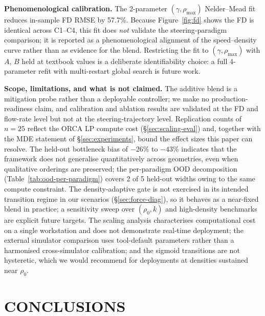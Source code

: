 \documentclass[a4paper,twoside]{article}
\begin{document}
\textbf{Phenomenological calibration.}
The 2-parameter $(\gamma,\rho_{\max})$ Nelder--Mead fit reduces in-sample FD RMSE by 57.7\%. Because Figure~\ref{fig:fd} shows the FD is identical across C1--C4, this fit does \emph{not} validate the steering-paradigm comparison; it is reported as a phenomenological alignment of the speed--density curve rather than as evidence for the blend. Restricting the fit to $(\gamma,\rho_{\max})$ with $A$, $B$ held at textbook values is a deliberate identifiability choice: a full 4-parameter refit with multi-restart global search is future work.

\textbf{Scope, limitations, and what is not claimed.}
The additive blend is a mitigation probe rather than a deployable controller; we make no production-readiness claim, and calibration and ablation results are validated at the FD and flow-rate level but not at the steering-trajectory level. Replication counts of $n=25$ reflect the ORCA LP compute cost (\S\ref{sec:scaling-eval}) and, together with the MDE statement of \S\ref{sec:experiments}, bound the effect sizes this paper can resolve. The held-out bottleneck bias of $-26\%$ to $-43\%$ indicates that the framework does not generalise quantitatively across geometries, even when qualitative orderings are preserved; the per-paradigm OOD decomposition (Table~\ref{tab:ood-per-paradigm}) covers 2 of 5 held-out widths owing to the same compute constraint. The density-adaptive gate is not exercised in its intended transition regime in our scenarios (\S\ref{sec:force-diag}), so it behaves as a near-fixed blend in practice; a sensitivity sweep over $(\rho_0,k)$ and high-density benchmarks are explicit future targets. The scaling analysis characterises computational cost on a single workstation and does not demonstrate real-time deployment; the external simulator comparison uses tool-default parameters rather than a harmonised cross-simulator calibration; and the sigmoid transitions are not hysteretic, which we would recommend for deployments at densities sustained near $\rho_0$.


\section{\uppercase{Conclusions}}
\label{sec:conclusion}
\end{document}
